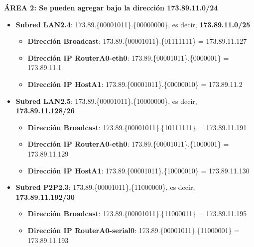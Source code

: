 \par \colorbox{lilaclaro}{\textbf{ÁREA 2: Se pueden agregar bajo la dirección 173.89.11.0/24}}
\begin{itemize}
	\item{\textbf{Subred LAN2.4}:} 173.89.\{\textcolor{azul}{000010}\textcolor{rojo}{11}\}.\{\textcolor{rojo}{0}0000000\}, es decir, \textbf{173.89.11.0/25}
		\begin{itemize}
			\item{\textbf{Dirección Broadcast}}: 173.89.\{\textcolor{azul}{000010}\textcolor{rojo}{11}\}.\{\textcolor{rojo}{0}1111111\} = 173.89.11.127
			\item{\textbf{Dirección IP RouterA0-eth0}}: 173.89.\{\textcolor{azul}{000010}\textcolor{rojo}{11}\}.\{\textcolor{rojo}{0}000001\} = 173.89.11.1
			\item{\textbf{Dirección IP HostA1}}: 173.89.\{\textcolor{azul}{000010}\textcolor{rojo}{11}\}.\{\textcolor{rojo}{0}0000010\} = 173.89.11.2
		\end{itemize}
	\item{\textbf{Subred LAN2.5}:} 173.89.\{\textcolor{azul}{000010}\textcolor{rojo}{11}\}.\{\textcolor{rojo}{10}000000\}, es decir, \textbf{173.89.11.128/26}
		\begin{itemize}
			\item{\textbf{Dirección Broadcast}}: 173.89.\{\textcolor{azul}{000010}\textcolor{rojo}{11}\}.\{\textcolor{rojo}{10}111111\} = 173.89.11.191
			\item{\textbf{Dirección IP RouterA0-eth0}}: 173.89.\{\textcolor{azul}{000010}\textcolor{rojo}{11}\}.\{\textcolor{rojo}{10}00001\} = 173.89.11.129
			\item{\textbf{Dirección IP HostA1}}: 173.89.\{\textcolor{azul}{000010}\textcolor{rojo}{11}\}.\{\textcolor{rojo}{10}000010\} = 173.89.11.130
		\end{itemize}
	\item{\textbf{Subred P2P2.3}:} 173.89.\{\textcolor{azul}{000010}\textcolor{rojo}{11}\}.\{\textcolor{rojo}{110000}00\}, es decir, \textbf{173.89.11.192/30}
		\begin{itemize}
			\item{\textbf{Dirección Broadcast}}: 173.89.\{\textcolor{azul}{000010}\textcolor{rojo}{11}\}.\{\textcolor{rojo}{110000}11\} = 173.89.11.195
			\item{\textbf{Dirección IP RouterA0-serial0}}: 173.89.\{\textcolor{azul}{000010}\textcolor{rojo}{11}\}.\{\textcolor{rojo}{110000}01\} = 173.89.11.193

\end{itemize}
\end{itemize}

